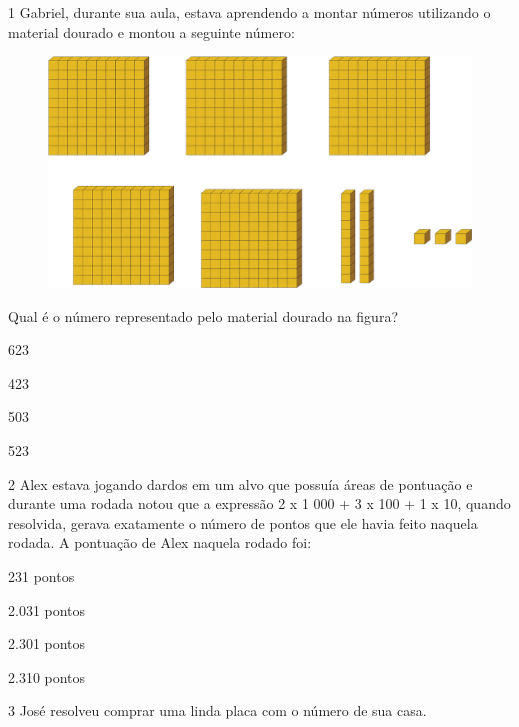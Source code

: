 
\num{1} Gabriel, durante sua aula, estava aprendendo a montar números utilizando o
material dourado e montou a seguinte número:

\begin{figure}[htpb!]
\centering
\includegraphics[width=\textwidth]{./media/image91.png}
\end{figure}

Qual é o número representado pelo material dourado na figura?

\begin{escolha}
\item
  623
\item
  423
\item
  503
\item
  523
\end{escolha}


\num{2} Alex estava jogando dardos em um alvo que possuía áreas de pontuação e
durante uma rodada notou que a expressão 2 x 1 000 + 3 x 100 + 1 x 10,
quando resolvida, gerava exatamente o número de pontos que ele havia
feito naquela rodada. A pontuação de Alex naquela rodado foi:

\begin{multicols}{2}
\begin{escolha}
\item
  231 pontos
\item
  2.031 pontos
\item
  2.301 pontos
\item
  2.310 pontos
\end{escolha}
\end{multicols}

\pagebreak
\num{3} José resolveu comprar uma linda placa com o número de sua casa.

